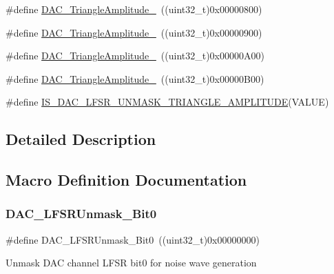 \begin{DoxyCompactItemize}
\item 
\#define \mbox{\hyperlink{group___d_a_c__lfsrunmask__triangleamplitude_ga565b0c97bbdf152756617d491bf8ef85}{D\+A\+C\+\_\+\+Triangle\+Amplitude\+\_}}~((uint32\+\_\+t)0x00000800)
\item 
\#define \mbox{\hyperlink{group___d_a_c__lfsrunmask__triangleamplitude_ga7d573b0cebb1b939bd83367effb93d89}{D\+A\+C\+\_\+\+Triangle\+Amplitude\+\_}}~((uint32\+\_\+t)0x00000900)
\item 
\#define \mbox{\hyperlink{group___d_a_c__lfsrunmask__triangleamplitude_gad33d28d7fcc09d84500ea9b6e6c5feed}{D\+A\+C\+\_\+\+Triangle\+Amplitude\+\_}}~((uint32\+\_\+t)0x00000\+A00)
\item 
\#define \mbox{\hyperlink{group___d_a_c__lfsrunmask__triangleamplitude_ga3ce69f5a63a2464dc4b5f73cb6fe72f5}{D\+A\+C\+\_\+\+Triangle\+Amplitude\+\_}}~((uint32\+\_\+t)0x00000\+B00)
\item 
\#define \mbox{\hyperlink{group___d_a_c__lfsrunmask__triangleamplitude_ga20f7c3c43f917f14593f0c478c2412e1}{I\+S\+\_\+\+D\+A\+C\+\_\+\+L\+F\+S\+R\+\_\+\+U\+N\+M\+A\+S\+K\+\_\+\+T\+R\+I\+A\+N\+G\+L\+E\+\_\+\+A\+M\+P\+L\+I\+T\+U\+DE}}(V\+A\+L\+UE)
\end{DoxyCompactItemize}


\subsection{Detailed Description}


\subsection{Macro Definition Documentation}
\mbox{\label{group___d_a_c__lfsrunmask__triangleamplitude_ga60794fd5092a332cfa82e1cee13945fc}} 
\subsubsection{\texorpdfstring{DAC\_LFSRUnmask\_Bit0}{DAC\_LFSRUnmask\_Bit0}}
{\footnotesize\ttfamily \#define D\+A\+C\+\_\+\+L\+F\+S\+R\+Unmask\+\_\+\+Bit0~((uint32\+\_\+t)0x00000000)}

Unmask D\+AC channel L\+F\+SR bit0 for noise wave generation \mbox{\label{group___d_a_c__lfsrunmask__triangleamplitude_ga7670f0e10f062571d0e56027ef653228}} 
